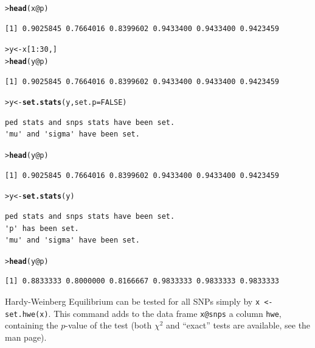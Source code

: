 \documentclass{article}\usepackage[]{graphicx}\usepackage[]{color}
\makeatletter
\newcommand{\hlnum}[1]{\textcolor[rgb]{0.686,0.059,0.569}{#1}}%
\newcommand{\hlopt}[1]{\textcolor[rgb]{0,0,0}{#1}}%
\newcommand{\hlstd}[1]{\textcolor[rgb]{0.345,0.345,0.345}{#1}}%
\newcommand{\hlkwb}[1]{\textcolor[rgb]{0.69,0.353,0.396}{#1}}%
\newcommand{\hlkwc}[1]{\textcolor[rgb]{0.333,0.667,0.333}{#1}}%
\newcommand{\hlkwd}[1]{\textcolor[rgb]{0.737,0.353,0.396}{\textbf{#1}}}%
\newenvironment{kframe}{%
 \def\at@end@of@kframe{}%
 \ifinner\ifhmode%
  \def\at@end@of@kframe{\end{minipage}}%
  \begin{minipage}{\columnwidth}%
 \fi\fi%
 \def\FrameCommand##1{\hskip\@totalleftmargin \hskip-\fboxsep
 \colorbox{shadecolor}{##1}\hskip-\fboxsep
     \hskip-\linewidth \hskip-\@totalleftmargin \hskip\columnwidth}%
 \MakeFramed {\advance\hsize-\width
   \@totalleftmargin\z@ \linewidth\hsize
   \@setminipage}}%
 {\par\unskip\endMakeFramed%
 \at@end@of@kframe}
\newenvironment{knitrout}{}{} %
\makeatother
\begin{document}
\begin{knitrout}
\color{fgcolor}\begin{kframe}
\begin{alltt}
\hlstd{> }\hlkwd{head}\hlstd{(x}\hlopt{@}\hlkwc{p}\hlstd{)}
\end{alltt}
\begin{verbatim}
[1] 0.9025845 0.7664016 0.8399602 0.9433400 0.9433400 0.9423459
\end{verbatim}
\begin{alltt}
\hlstd{> }\hlstd{y} \hlkwb{<-} \hlstd{x[}\hlnum{1}\hlopt{:}\hlnum{30}\hlstd{,]}
\hlstd{> }\hlkwd{head}\hlstd{(y}\hlopt{@}\hlkwc{p}\hlstd{)}
\end{alltt}
\begin{verbatim}
[1] 0.9025845 0.7664016 0.8399602 0.9433400 0.9433400 0.9423459
\end{verbatim}
\begin{alltt}
\hlstd{> }\hlstd{y} \hlkwb{<-} \hlkwd{set.stats}\hlstd{(y,} \hlkwc{set.p} \hlstd{=} \hlnum{FALSE}\hlstd{)}
\end{alltt}
\begin{verbatim}
ped stats and snps stats have been set. 
'mu' and 'sigma' have been set.
\end{verbatim}
\begin{alltt}
\hlstd{> }\hlkwd{head}\hlstd{(y}\hlopt{@}\hlkwc{p}\hlstd{)}
\end{alltt}
\begin{verbatim}
[1] 0.9025845 0.7664016 0.8399602 0.9433400 0.9433400 0.9423459
\end{verbatim}
\begin{alltt}
\hlstd{> }\hlstd{y} \hlkwb{<-} \hlkwd{set.stats}\hlstd{(y)}
\end{alltt}
\begin{verbatim}
ped stats and snps stats have been set. 
'p' has been set. 
'mu' and 'sigma' have been set.
\end{verbatim}
\begin{alltt}
\hlstd{> }\hlkwd{head}\hlstd{(y}\hlopt{@}\hlkwc{p}\hlstd{)}
\end{alltt}
\begin{verbatim}
[1] 0.8833333 0.8000000 0.8166667 0.9833333 0.9833333 0.9833333
\end{verbatim}
\end{kframe}
\end{knitrout}

  Hardy-Weinberg Equilibrium can be tested for all SNPs simply by \verb!x <- set.hwe(x)!. 
  This command adds to the data frame \verb!x@snps! a column \verb!hwe!, containing the
  $p$-value of the test (both $\chi^2$ and ``exact'' tests are available, see the man
  page).
\end{document}
